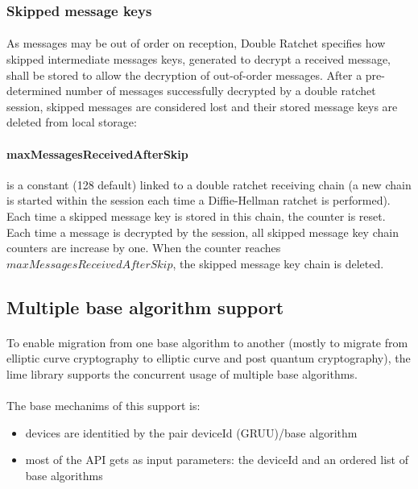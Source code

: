 \documentclass[a4paper,11pt]{article}
\begin{document}
    \subsubsection{Skipped message keys}
      \paragraph{}As messages may be out of order on reception, Double Ratchet specifies how skipped intermediate messages keys, generated to decrypt a received message, shall be stored to allow the decryption of out-of-order messages. After a pre-determined number of messages successfully decrypted by a double ratchet session, skipped messages are considered lost and their stored message keys are deleted from local storage:
      \paragraph{maxMessagesReceivedAfterSkip} is a constant (128 default) linked to a double ratchet receiving chain (a new chain is started within the session each time a Diffie-Hellman ratchet is performed). Each time a skipped message key is stored in this chain, the counter is reset. Each time a message is decrypted by the session, all skipped message key chain counters are increase by one. When the counter reaches $maxMessagesReceivedAfterSkip$, the skipped message key chain is deleted.


  \subsection{Multiple base algorithm support}
  \paragraph{}To enable migration from one base algorithm to another (mostly to migrate from elliptic curve cryptography to elliptic curve and post quantum cryptography), the lime library supports the concurrent usage of multiple base algorithms.
  \paragraph{}The base mechanims of this support is:
  \begin{itemize}
   \item devices are identitied by the pair deviceId (GRUU)/base algorithm
   \item most of the API gets as input parameters: the deviceId and an ordered list of base algorithms
  \end{itemize}
\end{document}
